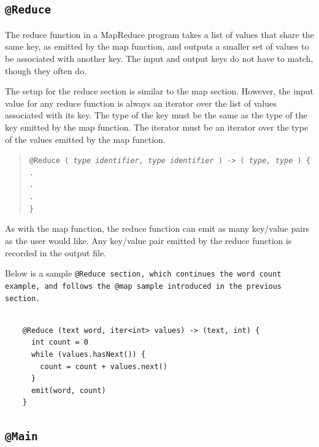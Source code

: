 \documentclass{article}
\begin{document}

\subsection{\tt @Reduce \rm} %
\label{sub:tt_reduce_rm}

The reduce function in a MapReduce program takes a list of values that share the
same key, as emitted by the map function, and outputs a smaller set of values to
be associated with another key. The input and output keys do not have to match,
though they often do.

The setup for the reduce section is similar to the map section. However, the input
value for any reduce function is always an iterator over the list of values
associated with its key. The type of the key must be the same as the type of the
key emitted by the map function. The iterator must be an iterator over the type of
the values emitted by the map function.

\begin{quotation}
  \tt @Reduce ( \rm \emph{type identifier, type identifier} \tt ) -> ( \rm \emph{type, type} \tt ) \{ \\
  \indent \indent . \\
  \indent \indent . \\
  \indent \indent . \\
  \indent \tt \} \rm
\end{quotation}

As with the map function, the reduce function can emit as many key/value pairs as
the user would like. Any key/value pair emitted by the reduce function is recorded
in the output file.

Below is a sample \tt @Reduce \rm section, which continues the word count example,
and follows the \tt @map \rm sample introduced in the previous section.

\begin{verbatim} 

    @Reduce (text word, iter<int> values) -> (text, int) {
      int count = 0
      while (values.hasNext()) {
        count = count + values.next()
      }
      emit(word, count)
    }

\end{verbatim} 


\subsection{\tt @Main \rm} %
\label{sec:tt_main_rm}
\end{document}
